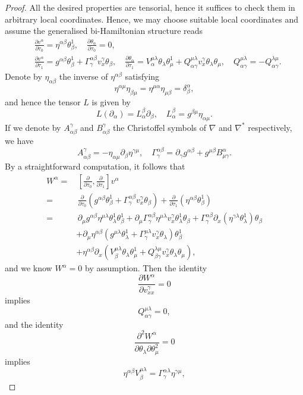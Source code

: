 \documentclass[10pt,a4paper]{amsart}
\newcommand{\Qg}{\Gamma}
\newcommand{\diff}[2]{\frac{\partial #1}{\partial #2}}
\newcommand{\fk}[2]{\left[#1, #2\right]}
\newcommand{\kk}[1]{\left(#1\right)}
\newcommand{\qa}{\alpha}
\newcommand{\qb}{\beta}
\newcommand{\qd}{\delta}
\newcommand{\qg}{\gamma}
\newcommand{\ql}{\lambda}
\newcommand{\qp}{\partial}
\newcommand{\qth}{\theta}
\newcommand{\qt}{\tau}
\begin{document}
\begin{proof}
  All the desired properties are tensorial, hence it suffices to check them in arbitrary local coordinates. Hence, we may choose suitable local coordinates and assume the generalised bi-Hamiltonian structure reads
  \begin{align*}
&\diff{v^\qa}{\qt_0} = \eta^{\qa\qb}\qth_\qb^1,\quad \diff{\qth_\qa}{\qt_0} = 0,\\
&\diff{v^\qa}{\qt_1} = g^{\qa\qb}\qth_\qb^1+\Qg^{\qa\qb}_\qg v^\qg_x\qth_\qb,\quad \diff{\qth_\qa}{\qt_1} = V_\qa^{\mu\ql}\qth_\ql\qth_\mu^1+Q^{\mu\ql}_{\qa\qg}v^\qg_x\qth_\ql\qth_\mu,\quad Q^{\mu\ql}_{\qa\qg}=-Q^{\ql\mu}_{\qa\qg}.
  \end{align*}
  Denote by $\eta_{\qa\qb}$ the inverse of $\eta^{\qa\qb}$ satisfying
  \[
  \eta^{\qa\mu}\eta_{\qb\mu} = \eta^{\mu\qa}\eta_{\mu\qb} = \qd^\qa_\qb,
  \]
  and hence the tensor $L$ is given by 
  \[
  L(\qp_\qa) = L^\qb_\qa\qp_\qb,\quad L^\qb_\qa = g^{\qb\mu}\eta_{\qa\mu}.
  \]
  If we denote by $A^\qg_{\qa\qb}$ and $B^\qg_{\qa\qb}$ the Christoffel symbols of $\nabla$ and $\nabla^*$ respectively, we have 
 \[
    A^\qg_{\qa\qb} = -\eta_{\qa\mu}\qp_\qb\eta^{\qg\mu},\quad \Qg^{\qa\qb}_\qg = \qp_\qg g^{\qa\qb}+g^{\mu\qb}B^\qa_{\mu\qg}.
\]
  By a straightforward computation, it follows that  
  \begin{align*}
    W^\qa =&\, \fk{\diff{}{\qt_0}}{\diff{}{\qt_1}}v^\qa\\
    =&\,\diff{}{\qt_0}\kk{g^{\qa\qb}\qth_\qb^1+\Qg^{\qa\qb}_\qg v^\qg_x\qth_\qb}+\diff{}{\qt_1}\kk{\eta^{\qa\qb}\qth_\qb^1}\\
    =&\,\qp_\mu g^{\qa\qb}\eta^{\mu\ql}\qth_\ql^1\qth_\qb^1+\qp_\mu\Qg^{\qa\qb}_\qg\eta^{\mu\ql}v^\qg_x\qth_\ql^1\qth_\qb+\Qg^{\qa\qb}_\qg\qp_x\kk{\eta^{\qg\ql}\qth_\ql^1}\qth_\qb\\
    &+\qp_\mu\eta^{\qa\qb}\kk{g^{\mu\ql}\qth_\ql^1+\Qg^{\mu\ql}_\qg v^\qg_x\qth_\ql}\qth_\qb^1\\
    &+\eta^{\qa\qb}\qp_x\kk{V_\qb^{\mu\ql}\qth_\ql\qth_\mu^1+Q^{\ql\mu}_{\qb\qg}v^\qg_x\qth_\ql\qth_\mu},
  \end{align*}
  and we know $W^\qa = 0$ by assumption. Then the identity 
  \[
  \diff{W^\qa}{v^\qg_{xx}} = 0
  \]
  implies 
  \[
  Q^{\mu\ql}_{\qa\qg} = 0,
  \]
  and the identity
  \[
  \frac{\qp^2 W^\qa}{\qp \qth_\ql\qp \qth_\mu^2} = 0
  \]
  implies 
  \begin{equation}
    \label{BP}
    \eta^{\qa\qb}V_\qb^{\mu\ql} = \Qg^{\qa\ql}_\qg \eta^{\qg\mu},
  \end{equation}

\end{proof}
\end{document}

